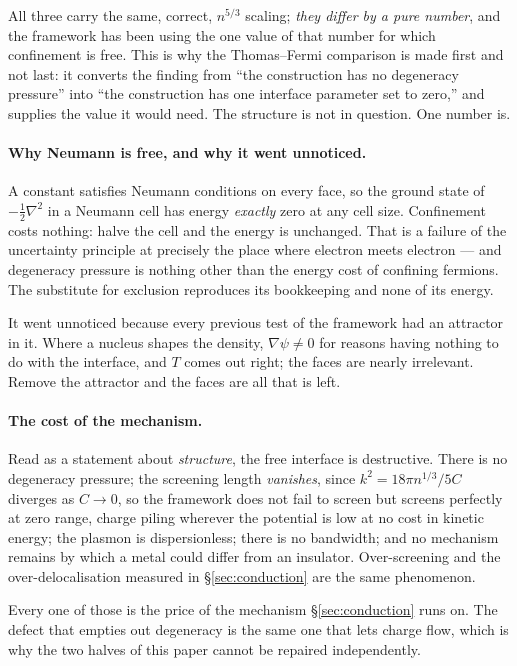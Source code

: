 \documentclass[11pt]{article}
\newcommand{\grad}{\nabla}
\newcommand{\half}{\tfrac12}
\begin{document}
\noindent All three carry the same, correct, $n^{5/3}$ scaling; \emph{they differ by a pure number},
and the framework has been using the one value of that number for which confinement is free. This is
why the Thomas--Fermi comparison is made first and not last: it converts the finding from ``the
construction has no degeneracy pressure'' into ``the construction has one interface parameter set to
zero,'' and supplies the value it would need. The structure is not in question. One number is.

\paragraph{Why Neumann is free, and why it went unnoticed.} A constant satisfies Neumann conditions
on every face, so the ground state of $-\half\grad^2$ in a Neumann cell has energy \emph{exactly}
zero at any cell size. Confinement costs nothing: halve the cell and the energy is unchanged. That is
a failure of the uncertainty principle at precisely the place where electron meets electron --- and
degeneracy pressure is nothing other than the energy cost of confining fermions. The substitute for
exclusion reproduces its bookkeeping and none of its energy.

It went unnoticed because every previous test of the framework had an attractor in it. Where a
nucleus shapes the density, $\grad\psi\neq0$ for reasons having nothing to do with the interface, and
$T$ comes out right; the faces are nearly irrelevant. Remove the attractor and the faces are all that
is left.

\paragraph{The cost of the mechanism.} Read as a statement about \emph{structure}, the free
interface is destructive. There is no
degeneracy pressure; the screening length \emph{vanishes}, since $k^2=18\pi n^{1/3}/5C$ diverges as
$C\to0$, so the framework does not fail to screen but screens perfectly at zero range, charge piling
wherever the potential is low at no cost in kinetic energy; the plasmon is dispersionless; there is
no bandwidth; and no mechanism remains by which a metal could differ from an insulator. Over-screening
and the over-delocalisation measured in \S\ref{sec:conduction} are the same phenomenon.

Every one of those is the price of the mechanism \S\ref{sec:conduction} runs on. The defect that
empties out degeneracy is the same one that lets charge flow, which is why the two halves of this
paper cannot be repaired independently.
\end{document}
